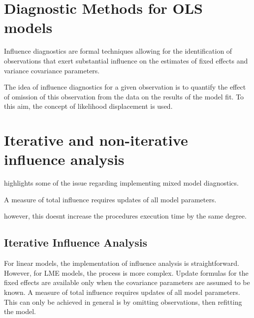 \documentclass[12pt, a4paper]{article}
\begin{document}
	
	\section*{Diagnostic Methods for OLS models}
	Influence diagnostics are formal techniques allowing for the identification of observations that exert substantial 
	influence on the estimates of fixed effects and variance covariance parameters. 
	
	The idea of influence diagnostics for a given observation is to quantify the effect of omission of this observation 
	from the data on the results of the model fit. To this aim, the concept of likelihood displacement is used. 
	
	


\section{Iterative and non-iterative influence analysis} %
\citet{schabenberger} highlights some of the issue regarding implementing mixed model diagnostics.

A measure of total influence requires updates of all model parameters.

however, this doesnt increase the procedures execution time by the same degree.
\subsection{Iterative Influence Analysis}

For linear models, the implementation of influence analysis is straightforward.
However, for LME models, the process is more complex. Update formulas for the fixed effects are available only when the covariance parameters are assumed to be known. A measure of total influence requires updates of all model parameters.
This can only be achieved in general is by omitting observations, then refitting the model.
\end{document}
